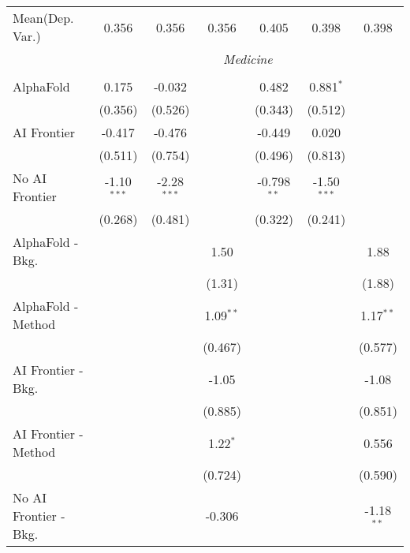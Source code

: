 \begin{tabular}{lcccccc}
Mean(Dep. Var.) & 0.356 & 0.356 & 0.356 & 0.405 & 0.398 & 0.398 \\
 & \multicolumn{6}{c}{\textit{Medicine}} \\ \\
   AlphaFold               & 0.175         & -0.032        &              & 0.482         & 0.881$^{*}$   &   \\   
                           & (0.356)       & (0.526)       &              & (0.343)       & (0.512)       &   \\   
   AI Frontier             & -0.417        & -0.476        &              & -0.449        & 0.020         &   \\   
                           & (0.511)       & (0.754)       &              & (0.496)       & (0.813)       &   \\   
   No AI Frontier          & -1.10$^{***}$ & -2.28$^{***}$ &              & -0.798$^{**}$ & -1.50$^{***}$ &   \\   
                           & (0.268)       & (0.481)       &              & (0.322)       & (0.241)       &   \\   
   AlphaFold - Bkg.        &               &               & 1.50         &               &               & 1.88\\   
                           &               &               & (1.31)       &               &               & (1.88)\\   
   AlphaFold - Method      &               &               & 1.09$^{**}$  &               &               & 1.17$^{**}$\\   
                           &               &               & (0.467)      &               &               & (0.577)\\   
   AI Frontier - Bkg.      &               &               & -1.05        &               &               & -1.08\\   
                           &               &               & (0.885)      &               &               & (0.851)\\   
   AI Frontier - Method    &               &               & 1.22$^{*}$   &               &               & 0.556\\   
                           &               &               & (0.724)      &               &               & (0.590)\\   
   No AI Frontier - Bkg.   &               &               & -0.306       &               &               & -1.18$^{**}$\\   

\end{tabular}
